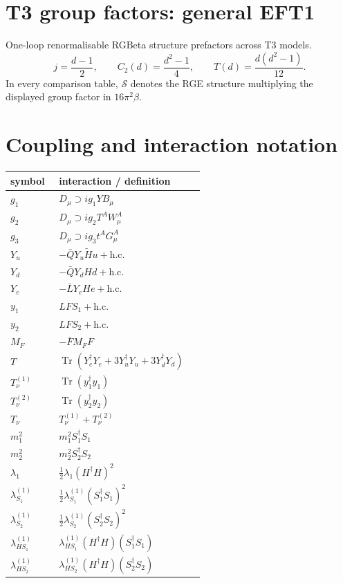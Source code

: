 \documentclass[9pt]{article}
\begin{document}
\section*{T3 group factors: general EFT1}
One-loop renormalisable RGBeta structure prefactors across T3 models.
\[j=\frac{d-1}{2},\qquad C_2(d)=\frac{d^2-1}{4},\qquad T(d)=\frac{d(d^2-1)}{12}.\]
In every comparison table, $\mathcal{S}$ denotes the RGE structure multiplying the displayed group factor in $16\pi^2\beta$.
\section*{Coupling and interaction notation}
\begin{longtable}{@{}p{0.23\linewidth}p{0.69\linewidth}@{}}
\toprule
symbol & interaction / definition \\
\midrule
$g_1$ & $D_\mu\supset i g_1YB_\mu$ \\
$g_2$ & $D_\mu\supset i g_2T^AW_\mu^A$ \\
$g_3$ & $D_\mu\supset i g_3t^AG_\mu^A$ \\
$Y_u$ & $-\bar QY_u\widetilde Hu+\mathrm{h.c.}$ \\
$Y_d$ & $-\bar QY_dHd+\mathrm{h.c.}$ \\
$Y_e$ & $-\bar LY_eHe+\mathrm{h.c.}$ \\
$y_1$ & $LFS_1+\mathrm{h.c.}$ \\
$y_2$ & $LFS_2+\mathrm{h.c.}$ \\
$M_F$ & $-\bar FM_FF$ \\
$T$ & $\operatorname{Tr}(Y_e^\dagger Y_e+3Y_u^\dagger Y_u+3Y_d^\dagger Y_d)$ \\
$T_\nu^{(1)}$ & $\operatorname{Tr}(y_1^\dagger y_1)$ \\
$T_\nu^{(2)}$ & $\operatorname{Tr}(y_2^\dagger y_2)$ \\
$T_\nu$ & $T_\nu^{(1)}+T_\nu^{(2)}$ \\
$m_1^2$ & $m_1^2S_1^\dagger S_1$ \\
$m_2^2$ & $m_2^2S_2^\dagger S_2$ \\
$\lambda_1$ & $\frac12\lambda_1(H^\dagger H)^2$ \\
$\lambda_{S_1}^{(1)}$ & $\frac12\lambda_{S_1}^{(1)}(S_1^\dagger S_1)^2$ \\
$\lambda_{S_2}^{(1)}$ & $\frac12\lambda_{S_2}^{(1)}(S_2^\dagger S_2)^2$ \\
$\lambda_{HS_1}^{(1)}$ & $\lambda_{HS_1}^{(1)}(H^\dagger H)(S_1^\dagger S_1)$ \\
$\lambda_{HS_2}^{(1)}$ & $\lambda_{HS_2}^{(1)}(H^\dagger H)(S_2^\dagger S_2)$ \\

\end{longtable}
\end{document}
